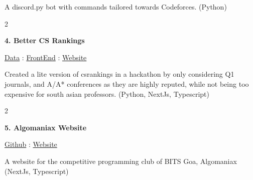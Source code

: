 \documentclass[10pt, letterpaper]{article}
\newenvironment{twocolentry}[2][]{
    \onecolentry
    \def\secondColumn{#2}
    \setcolumnwidth{\fill, 4.7 cm} %
    \begin{paracol}{2}
}{
    \switchcolumn \raggedleft \secondColumn
    \end{paracol}
    \endonecolentry
}
\begin{document}
        \vspace{0.15 cm} %
        A discord.py bot with commands tailored towards Codeforces. (Python)

        \vspace{0.4 cm} %

        \begin{twocolentry}{%
            \href{https://github.com/Darelife/HackenzaHackathon}{Data} : 
            \href{https://github.com/arin-r/better-csrankings}{FrontEnd} : 
            \href{https://better-csrankings.vercel.app/}{Website}%
        }
            \textbf{4. Better CS Rankings}
        \end{twocolentry}

        \vspace{0.15 cm} %
        Created a lite version of csrankings in a hackathon by only considering Q1 journals, and A/A* conferences as they are highly reputed, while not being too expensive for south asian professors. (Python, NextJs, Typescript)

        \vspace{0.4 cm} %

        \begin{twocolentry}{
            \href{https://github.com/Darelife/AlgoXXX}{Github} : \href{https://algomaniax.vercel.app/}{Website}
        }
            \textbf{5. Algomaniax Website}
        \end{twocolentry}

        \vspace{0.15 cm} %
        A website for the competitive programming club of BITS Goa, Algomaniax (NextJs, Typescript)

        \vspace{0.4 cm} %
\end{document}
